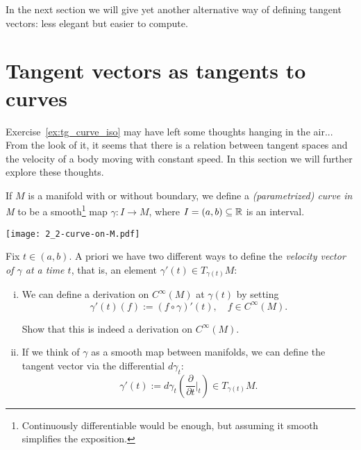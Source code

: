 In the next section we will give yet another alternative way of defining tangent vectors: less elegant but easier to compute.


\section{Tangent vectors as tangents to curves}

Exercise~\ref{ex:tg_curve_iso} may have left some thoughts hanging in the air...
From the look of it, it seems that there is a relation between tangent spaces and the velocity of a body moving with constant speed.
In this section we will further explore these thoughts.

\begin{definition}
  If $M$ is a manifold with or without boundary, we define a \emph{(parametrized) curve in M} to be a smooth\footnote{Continuously differentiable would be enough, but assuming it smooth simplifies the exposition.} map $\gamma : I \to M$, where $I=(a,b)\subseteq\mathbb{R}$ is an interval.
\end{definition}
\begin{marginfigure}
  \texttt{[image: 2\_2-curve-on-M.pdf]}
\end{marginfigure}

Fix $t\in(a,b)$. 
A priori we have two different ways to define the \emph{velocity vector of $\gamma$ at a time $t$}, that is, an element $\gamma'(t) \in T_{\gamma(t)}M$:
\begin{enumerate}[(i)]
  \item We can define a derivation on $C^\infty(M)$ at $\gamma(t)$ by setting
  \begin{equation}\label{eq:tg_curve_der}
    \gamma'(t) (f) := (f\circ\gamma)'(t), \quad f\in C^\infty(M).
  \end{equation}
  \begin{exercise}
    Show that this is indeed a derivation on $C^\infty(M)$.
  \end{exercise}
  \item If we think of $\gamma$ as a smooth map between manifolds, we can define the tangent vector via the differential $d\gamma_t$:
  \begin{equation}\label{eq:tg_curve_diff}
    \gamma'(t):= d\gamma_t\left(\frac{\partial}{\partial t}\Big|_t\right) \in T_{\gamma(t)}M.
  \end{equation}
\end{enumerate}


